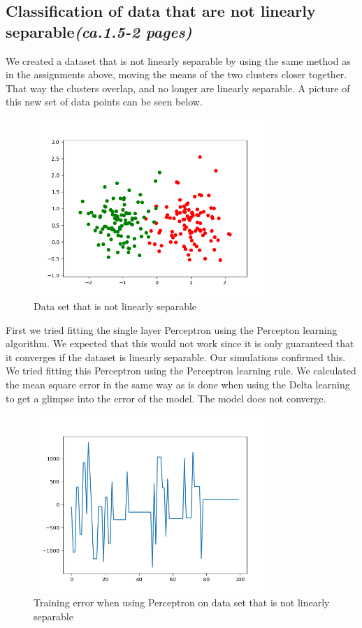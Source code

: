 \documentclass[a4paper]{article}
\begin{document}
\subsection{Classification of data that are not linearly separable\textit{(ca.1.5-2 pages)}}
We created a dataset that is not linearly separable by using the same method as in the assignments above, moving the means of the two clusters closer together. That way the clusters overlap, and no longer are linearly separable. A picture of this new set of data points can be seen below.
\begin{figure}[htb]
    \centering
    \includegraphics[width=0.8\textwidth]{Labs/Lab 1/Lab 1a/Results/overlapping_dataset.png}
    \caption{Data set that is not linearly separable}
    \label{fig:enter-label}
\end{figure}
First we tried fitting the single layer Perceptron using the Percepton learning algorithm. We expected that this would not work since it is only guaranteed that it converges if the dataset is linearly separable. Our simulations confirmed this. We tried fitting this Perceptron using the Perceptron learning rule. We calculated the mean square error in the same way as is done when using the Delta learning to get a glimpse into the error of the model. The model does not converge.

\begin{figure}[htb]
    \centering
    \includegraphics[width=0.8\textwidth]{Labs/Lab 1/Lab 1a/Results/perceptron-training-error-convergence.png}
    \caption{Training error when using Perceptron on data set that is not linearly separable}
    \label{fig:Perceptron-training-error}
\end{figure}
\end{document}
